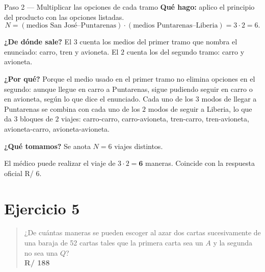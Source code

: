 \documentclass[11pt]{article}
\begin{document}
\begin{paso}{Paso 2 --- Multiplicar las opciones de cada tramo}
\textbf{Qué hago:} aplico el principio del producto con las opciones listadas.
\[
  N=(\text{medios San José--Puntarenas})\cdot(\text{medios Puntarenas--Liberia})=3\cdot 2=6 .
\]

\textbf{¿De dónde sale?} El $3$ cuenta los medios del primer tramo que nombra el enunciado: carro, tren y avioneta. El $2$ cuenta los del segundo tramo: carro y avioneta.

\textbf{¿Por qué?} Porque el medio usado en el primer tramo no elimina opciones en el segundo: aunque llegue en carro a Puntarenas, sigue pudiendo seguir en carro o en avioneta, según lo que dice el enunciado. Cada uno de los $3$ modos de llegar a Puntarenas se combina con cada uno de los $2$ modos de seguir a Liberia, lo que da $3$ bloques de $2$ viajes: carro-carro, carro-avioneta, tren-carro, tren-avioneta, avioneta-carro, avioneta-avioneta.

\textbf{¿Qué tomamos?} Se anota $N=6$ viajes distintos.
\end{paso}

\begin{resp}
El médico puede realizar el viaje de $3\cdot 2=\mathbf{6}$ maneras. Coincide con la respuesta oficial R/ 6.
\end{resp}

\section*{Ejercicio 5}

\begin{quote}
¿De cuántas maneras se pueden escoger al azar dos cartas sucesivamente de una baraja de 52 cartas tales que la primera carta sea un $A$ y la segunda no sea una $Q$?\\[2pt]
\textbf{R/ 188}
\end{quote}
\end{document}
